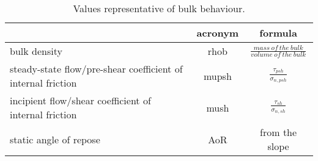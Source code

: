 \begin{table}[h]
  \centering
    \begin{tabular}{lcc}
    \hline
     & acronym & formula \\ 
     \hline
    bulk density & \acs{rhob} & $\frac{mass ~ of ~ the ~ bulk}{volume ~ of ~ the
    ~ bulk}$ \\
    [5pt]
     
    steady-state flow/pre-shear coefficient of internal friction & \acs{mupsh}
     & $\frac{\tau_{psh}}{\sigma_{n,psh}}$ \\      [5pt]
     
    incipient flow/shear coefficient of internal friction & \acs{mush} &
    $\frac{\tau_{sh}}{\sigma_{n,sh}}$ \\      [5pt]
     
    static angle of repose & \acs{AoR}   & from the slope \\
\hline
    
    \end{tabular}%
  \caption{Values representative of bulk behaviour.}
\label{tab:14bulkvalues}
\end{table}%